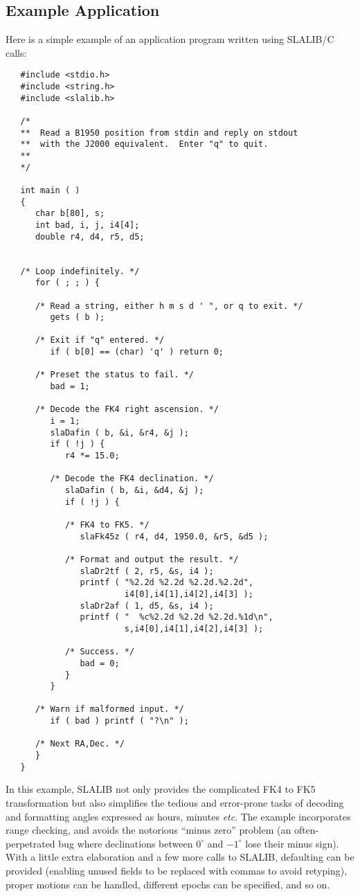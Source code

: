 \documentclass[11pt,fleqn,twoside]{article}
\renewcommand{\_}{{\tt\char'137}}     %
\begin{document}
\subsection{Example Application}
\label{exDafin}
Here is a simple example of an application program written
using SLALIB/C calls:
\vspace{-3ex}
\begin{verbatim}
   #include <stdio.h>
   #include <string.h>
   #include <slalib.h>
 
   /*
   **  Read a B1950 position from stdin and reply on stdout
   **  with the J2000 equivalent.  Enter "q" to quit.
   **
   */
 
   int main ( )
   {
      char b[80], s;
      int bad, i, j, i4[4];
      double r4, d4, r5, d5;
 
 
   /* Loop indefinitely. */
      for ( ; ; ) {
 
      /* Read a string, either h m s d ' ", or q to exit. */
         gets ( b );
 
      /* Exit if "q" entered. */
         if ( b[0] == (char) 'q' ) return 0;
 
      /* Preset the status to fail. */
         bad = 1;
 
      /* Decode the FK4 right ascension. */
         i = 1;
         slaDafin ( b, &i, &r4, &j );
         if ( !j ) {
            r4 *= 15.0;
 
         /* Decode the FK4 declination. */
            slaDafin ( b, &i, &d4, &j );
            if ( !j ) {
 
            /* FK4 to FK5. */
               slaFk45z ( r4, d4, 1950.0, &r5, &d5 );
 
            /* Format and output the result. */
               slaDr2tf ( 2, r5, &s, i4 );
               printf ( "%2.2d %2.2d %2.2d.%2.2d",
                        i4[0],i4[1],i4[2],i4[3] );
               slaDr2af ( 1, d5, &s, i4 );
               printf ( "  %c%2.2d %2.2d %2.2d.%1d\n",
                        s,i4[0],i4[1],i4[2],i4[3] );
 
            /* Success. */
               bad = 0;
            }
         }
 
      /* Warn if malformed input. */
         if ( bad ) printf ( "?\n" );
 
      /* Next RA,Dec. */
      }
   }
\end{verbatim}
\vspace{-3ex}
In this example, SLALIB not only provides the complicated FK4 to
FK5 transformation but also
simplifies the tedious and error-prone tasks
of decoding and formatting angles
expressed as hours, minutes {\it etc}.  The
example incorporates range checking, and avoids the
notorious ``minus zero'' problem (an often-perpetrated bug where
declinations between $0^{\circ}$ and $-1^{\circ}$ lose their minus
sign).
With a little extra elaboration and a few more calls to SLALIB,
defaulting can be provided (enabling unused fields to
be replaced with commas to avoid retyping), proper motions
can be handled, different epochs can be specified, and
so on.
 
\end{document}
